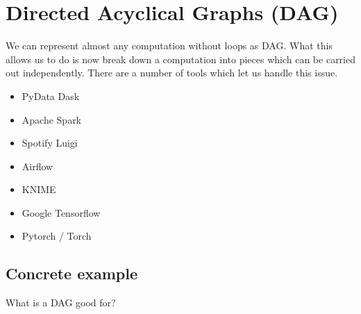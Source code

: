 \documentclass[letterpaper,10pt,english]{sphinxmanual}
\begin{document}
\section{Directed Acyclical Graphs (DAG)}
\label{\detokenize{01-Introduction:directed-acyclical-graphs-dag}}
\sphinxAtStartPar
We can represent almost any computation without loops as DAG. What this allows us to do is now break down a computation into pieces which can be carried out independently. There are a number of tools which let us handle this issue.
\begin{itemize}
\item {} 
\sphinxAtStartPar
PyData Dask \sphinxhyphen{} 

\item {} 
\sphinxAtStartPar
Apache Spark \sphinxhyphen{} 

\item {} 
\sphinxAtStartPar
Spotify Luigi \sphinxhyphen{} 

\item {} 
\sphinxAtStartPar
Airflow \sphinxhyphen{} 

\item {} 
\sphinxAtStartPar
KNIME \sphinxhyphen{} 

\item {} 
\sphinxAtStartPar
Google Tensorflow \sphinxhyphen{} 

\item {} 
\sphinxAtStartPar
Pytorch / Torch \sphinxhyphen{} 

\end{itemize}


\subsection{Concrete example}
\label{\detokenize{01-Introduction:concrete-example}}
\sphinxAtStartPar
What is a DAG good for?

\begin{sphinxVerbatim}[commandchars=\\\{\}]
   

   
     
     
\end{sphinxVerbatim}
\end{document}
